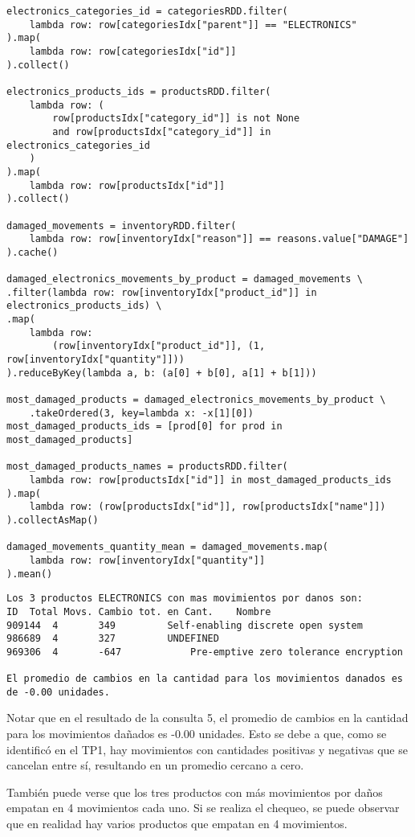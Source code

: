\begin{lstlisting}[caption={Resolución de la consulta 5 propuesta propia.}, xleftmargin=20pt, xrightmargin=20pt]
electronics_categories_id = categoriesRDD.filter(
    lambda row: row[categoriesIdx["parent"]] == "ELECTRONICS"
).map(
    lambda row: row[categoriesIdx["id"]]
).collect()

electronics_products_ids = productsRDD.filter(
    lambda row: (
        row[productsIdx["category_id"]] is not None
        and row[productsIdx["category_id"]] in electronics_categories_id
    )
).map(
    lambda row: row[productsIdx["id"]]
).collect()

damaged_movements = inventoryRDD.filter(
    lambda row: row[inventoryIdx["reason"]] == reasons.value["DAMAGE"]
).cache()

damaged_electronics_movements_by_product = damaged_movements \
.filter(lambda row: row[inventoryIdx["product_id"]] in electronics_products_ids) \
.map(
    lambda row:
        (row[inventoryIdx["product_id"]], (1, row[inventoryIdx["quantity"]]))
).reduceByKey(lambda a, b: (a[0] + b[0], a[1] + b[1]))

most_damaged_products = damaged_electronics_movements_by_product \
    .takeOrdered(3, key=lambda x: -x[1][0])
most_damaged_products_ids = [prod[0] for prod in most_damaged_products]

most_damaged_products_names = productsRDD.filter(
    lambda row: row[productsIdx["id"]] in most_damaged_products_ids
).map(
    lambda row: (row[productsIdx["id"]], row[productsIdx["name"]])
).collectAsMap()

damaged_movements_quantity_mean = damaged_movements.map(
    lambda row: row[inventoryIdx["quantity"]]
).mean()
\end{lstlisting}

\begin{lstlisting}[style=console, caption=Resultados de la consulta 5 propuesta propia, label={lst:propia_q5_results}, xleftmargin=10pt, xrightmargin=10pt]
Los 3 productos ELECTRONICS con mas movimientos por danos son:
ID	Total Movs.	Cambio tot. en Cant.	Nombre
909144	4		349			Self-enabling discrete open system
986689	4		327			UNDEFINED
969306	4		-647			Pre-emptive zero tolerance encryption

El promedio de cambios en la cantidad para los movimientos danados es de -0.00 unidades.
\end{lstlisting}

Notar que en el resultado de la consulta 5, el promedio de cambios en la cantidad para los movimientos dañados es -0.00 unidades. Esto se debe a que, como se identificó en el TP1, hay movimientos con cantidades positivas y negativas que se cancelan entre sí, resultando en un promedio cercano a cero.

También puede verse que los tres productos con más movimientos por daños empatan en 4 movimientos cada uno. Si se realiza el chequeo, se puede observar que en realidad hay varios productos que empatan en 4 movimientos.